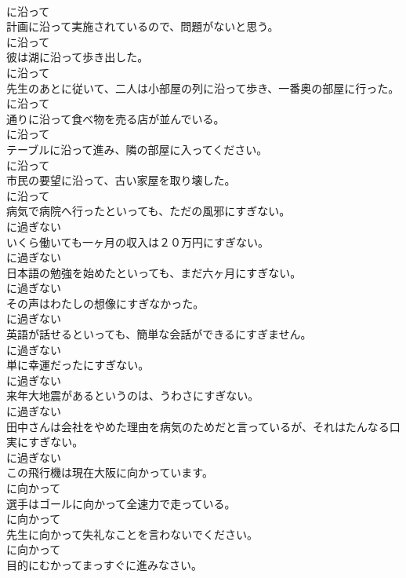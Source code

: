 \documentclass[8pt]{extreport}
\begin{document}
\begin{CJK}{UTF8}{min}
\\	に沿って
\\	計画に沿って実施されているので、問題がないと思う。	
\\	に沿って
\\	彼は湖に沿って歩き出した。	
\\	に沿って
\\	先生のあとに従いて、二人は小部屋の列に沿って歩き、一番奥の部屋に行った。	
\\	に沿って
\\	通りに沿って食べ物を売る店が並んでいる。	
\\	に沿って
\\	テーブルに沿って進み、隣の部屋に入ってください。	
\\	に沿って
\\	市民の要望に沿って、古い家屋を取り壊した。	
\\	に沿って
\\	病気で病院へ行ったといっても、ただの風邪にすぎない。	
\\	に過ぎない
\\	いくら働いても一ヶ月の収入は２０万円にすぎない。	
\\	に過ぎない
\\	日本語の勉強を始めたといっても、まだ六ヶ月にすぎない。	
\\	に過ぎない
\\	その声はわたしの想像にすぎなかった。	
\\	に過ぎない
\\	英語が話せるといっても、簡単な会話ができるにすぎません。	
\\	に過ぎない
\\	単に幸運だったにすぎない。	
\\	に過ぎない
\\	来年大地震があるというのは、うわさにすぎない。	
\\	に過ぎない
\\	田中さんは会社をやめた理由を病気のためだと言っているが、それはたんなる口実にすぎない。	
\\	に過ぎない
\\	この飛行機は現在大阪に向かっています。	
\\	に向かって
\\	選手はゴールに向かって全速力で走っている。	
\\	に向かって
\\	先生に向かって失礼なことを言わないでください。	
\\	に向かって
\\	目的にむかってまっすぐに進みなさい。	

\end{CJK}
\end{document}
